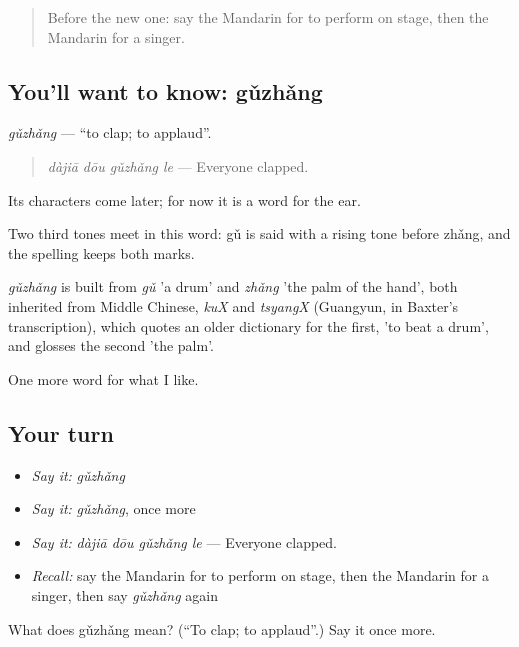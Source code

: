 \label{lesson:ZH-C257-guzhang}



\begin{quote}
Before the new one: say the Mandarin for to perform on stage, then the Mandarin for a singer.
\end{quote}

\subsection*{You'll want to know: gǔzhǎng}
\emph{gǔzhǎng} — \textquotedblleft{}to clap; to applaud\textquotedblright{}.

\begin{quote}
\emph{dàjiā dōu gǔzhǎng le} — Everyone clapped.
\end{quote}

Its characters come later; for now it is a word for the ear.

Two third tones meet in this word: gǔ is said with a rising tone before zhǎng, and the spelling keeps both marks.

\begin{cousinweb}
\emph{gǔzhǎng} is built from \emph{gǔ} 'a drum' and \emph{zhǎng} 'the palm of the hand', both inherited from Middle Chinese, \emph{kuX} and \emph{tsyangX} (Guangyun, in Baxter's transcription), which quotes an older dictionary for the first, 'to beat a drum', and glosses the second 'the palm'.
\end{cousinweb}

\begin{grammarlens}[title={What you've built}]
One more word for what I like.
\end{grammarlens}

\subsection*{Your turn}
\begin{itemize}
\raggedright
  \item \emph{Say it:} \emph{gǔzhǎng}
  \item \emph{Say it:} \emph{gǔzhǎng}, once more
  \item \emph{Say it:} \emph{dàjiā dōu gǔzhǎng le} — Everyone clapped.
  \item \emph{Recall:} say the Mandarin for to perform on stage, then the Mandarin for a singer, then say \emph{gǔzhǎng} again
\end{itemize}

\begin{tcolorbox}[breakable,colback=teal!4,colframe=teal!35!black,title={Before you move on}]
What does gǔzhǎng mean? (\textquotedblleft{}To clap; to applaud\textquotedblright{}.) Say it once more.
\end{tcolorbox}
